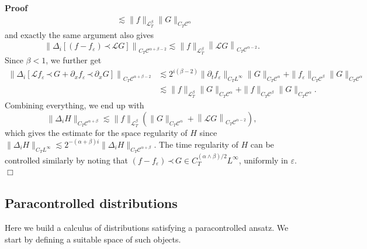\documentclass[a4paper,11pt]{article}
\newenvironment{proof}{\noindent\textbf{Proof\ }}{\hspace*{\fill}$\Box$\medskip}
\newcommand{\LL}{\mathscr{L}}
\newcommand{\CC}{\mathscr{C}}
\newcommand{\lpara}{\,\mathord{\prec}\,}
\begin{document}
\begin{proof}
\begin{align*}
     & \lesssim \| f \|_{\LL_T^{\beta}} \| G \|_{C_T \CC^{\alpha}}
  \end{align*}
  and exactly the same argument also gives
  \[ \left\| \Delta_i \left[ (f - f_{\varepsilon}) \lpara \LL G \right]
     \right\|_{C_T \CC^{\alpha + \beta - 2}} \lesssim \| f \|_{\LL_T^{\beta}}
     \left\| \LL G \right\|_{C_T \CC^{\alpha - 2}} . \]
  Since $\beta < 1$, we further get
  \begin{align*}
     \left\| \Delta_i \left[ \LL f_{\varepsilon} \lpara G + \partial_x f_{\varepsilon} \lpara \partial_x G \right] \right\|_{C_T \CC^{\alpha + \beta - 2}} & \lesssim 2^{i (\beta - 2)} \| \partial_t f_{\varepsilon} \|_{C_T L^{\infty}} \| G \|_{C_T \CC^{\alpha}} + \| f_{\varepsilon}  \|_{C_T \CC^{\beta}} \| G \|_{C_T \CC^{\alpha}} \\
     & \lesssim \| f \|_{\LL_T^{\beta}} \| G \|_{C_T \CC^{\alpha}} + \| f \|_{C_T \CC^{\beta}} \| G \|_{C_T \CC^{\alpha}}.
  \end{align*}
  Combining everything, we end up with
  \[ \| \Delta_i H \|_{C_T \CC^{\alpha + \beta}} \lesssim \| f
     \|_{\LL^{\beta}_T} ( \| G \|_{C_T \CC^{\alpha}} + \left\| \LL G
     \right\|_{C_T \CC^{\alpha - 2}} ), \]
  which gives the estimate for the space regularity of $H$ since $\| \Delta_i
  H \|_{C_T L^{\infty}} \lesssim 2^{- (\alpha + \beta) i} \| \Delta_i H
  \|_{C_T \CC^{\alpha + \beta}}$. The time regularity of $H$ can be controlled
  similarly by noting that $(f - f_{\varepsilon}) \lpara G \in C^{(\alpha
  \wedge \beta) / 2}_T L^{\infty}$, uniformly in $\varepsilon$. 
\end{proof}

\subsection{Paracontrolled distributions}

Here we build a calculus of distributions satisfying a paracontrolled ansatz.
We start by defining a suitable space of such objects.
\end{document}
